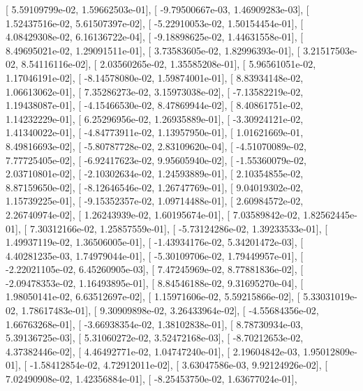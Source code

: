 \documentclass{article}
\begin{document}
       [  5.59109799e-02,   1.59662503e-01],
       [ -9.79500667e-03,   1.46909283e-03],
       [  1.52437516e-02,   5.61507397e-02],
       [ -5.22910053e-02,   1.50154454e-01],
       [  4.08429308e-02,   6.16136722e-04],
       [ -9.18898625e-02,   1.44631558e-01],
       [  8.49695021e-02,   1.29091511e-01],
       [  3.73583605e-02,   1.82996393e-01],
       [  3.21517503e-02,   8.54116116e-02],
       [  2.03560265e-02,   1.35585208e-01],
       [  5.96561051e-02,   1.17046191e-02],
       [ -8.14578080e-02,   1.59874001e-01],
       [  8.83934148e-02,   1.06613062e-01],
       [  7.35286273e-02,   3.15973038e-02],
       [ -7.13582219e-02,   1.19438087e-01],
       [ -4.15466530e-02,   8.47869944e-02],
       [  8.40861751e-02,   1.14232229e-01],
       [  6.25296956e-02,   1.26935889e-01],
       [ -3.30924121e-02,   1.41340022e-01],
       [ -4.84773911e-02,   1.13957950e-01],
       [  1.01621669e-01,   8.49816693e-02],
       [ -5.80787728e-02,   2.83109620e-04],
       [ -4.51070089e-02,   7.77725405e-02],
       [ -6.92417623e-02,   9.95605940e-02],
       [ -1.55360079e-02,   2.03710801e-02],
       [ -2.10302634e-02,   1.24593889e-01],
       [  2.10354855e-02,   8.87159650e-02],
       [ -8.12646546e-02,   1.26747769e-01],
       [  9.04019302e-02,   1.15739225e-01],
       [ -9.15352357e-02,   1.09714488e-01],
       [  2.60984572e-02,   2.26740974e-02],
       [  1.26243939e-02,   1.60195674e-01],
       [  7.03589842e-02,   1.82562445e-01],
       [  7.30312166e-02,   1.25857559e-01],
       [ -5.73124286e-02,   1.39233533e-01],
       [  1.49937119e-02,   1.36506005e-01],
       [ -1.43934176e-02,   5.34201472e-03],
       [  4.40281235e-03,   1.74979044e-01],
       [ -5.30109706e-02,   1.79449957e-01],
       [ -2.22021105e-02,   6.45260905e-03],
       [  7.47245969e-02,   8.77881836e-02],
       [ -2.09478353e-02,   1.16493895e-01],
       [  8.84546188e-02,   9.31695270e-04],
       [  1.98050141e-02,   6.63512697e-02],
       [  1.15971606e-02,   5.59215866e-02],
       [  5.33031019e-02,   1.78617483e-01],
       [  9.30909898e-02,   3.26433964e-02],
       [ -4.55684356e-02,   1.66763268e-01],
       [ -3.66938354e-02,   1.38102838e-01],
       [  8.78730934e-03,   5.39136725e-03],
       [  5.31060272e-02,   3.52472168e-03],
       [ -8.70212653e-02,   4.37382446e-02],
       [  4.46492771e-02,   1.04747240e-01],
       [  2.19604842e-03,   1.95012809e-01],
       [ -1.58412854e-02,   4.72912011e-02],
       [  3.63047586e-03,   9.92124926e-02],
       [  7.02490908e-02,   1.42356884e-01],
       [ -8.25453750e-02,   1.63677024e-01],
\end{document}
